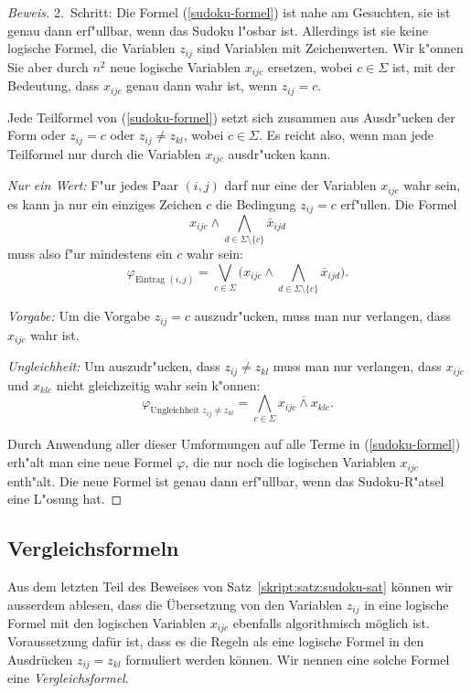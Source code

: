 \begin{proof}[Beweis]
2.~Schritt: Die Formel (\ref{sudoku-formel}) ist nahe am Gesuchten,
sie ist genau dann erf"ullbar, wenn das Sudoku l"osbar ist. Allerdings
ist sie keine logische Formel, die Variablen $z_{ij}$ sind Variablen mit
Zeichenwerten. Wir k"onnen Sie aber durch $n^2$ neue logische Variablen
$x_{ijc}$ ersetzen, wobei $c\in \Sigma$ ist, mit der Bedeutung, dass
$x_{ijc}$ genau dann wahr ist, wenn $z_{ij}=c$. 

Jede Teilformel von (\ref{sudoku-formel}) setzt sich zusammen
aus Ausdr"ucken der Form oder $z_{ij}=c$
oder $z_{ij}\ne z_{kl}$, wobei $c\in\Sigma$.
Es reicht also, wenn man jede Teilformel nur durch die Variablen $x_{ijc}$ 
ausdr"ucken kann.
\begin{compactenum}
\item {\em Nur ein Wert:} F"ur jedes Paar $(i,j)$ darf nur eine der
Variablen $x_{ijc}$ wahr sein, es kann ja nur ein einziges Zeichen $c$
die Bedingung $z_{ij}=c$ erf"ullen. Die Formel
\[
x_{ijc}\wedge \bigwedge_{d\in\Sigma\setminus\{c\}}\bar x_{ijd}
\]
muss also f"ur mindestens ein $c$ wahr sein:
\[
\varphi_{\text{Eintrag $(i,j)$}}
=
\bigvee_{c\in \Sigma}
\biggl(
x_{ijc}\wedge \bigwedge_{d\in\Sigma\setminus\{c\}}\bar x_{ijd}
\biggr).
\]
\item {\em Vorgabe:} Um die Vorgabe $z_{ij}=c$ auszudr"ucken, muss man
nur verlangen, dass $x_{ijc}$ wahr ist.
\item {\em Ungleichheit:} Um auszudr"ucken, dass $z_{ij} \ne z_{kl}$ muss
man nur verlangen, dass $x_{ijc}$ und $x_{klc}$ nicht gleichzeitig wahr
sein k"onnen:
\[
\varphi_{\text{Ungleichheit $z_{ij}\ne z_{kl}$}}
=
\bigwedge_{c\in\Sigma}
\overline{x_{ijc}\wedge x_{klc}}.
\]
\end{compactenum}
Durch Anwendung aller dieser Umformungen auf alle Terme in (\ref{sudoku-formel})
erh"alt man eine neue Formel $\varphi$, die nur noch die logischen
Variablen $x_{ijc}$ enth"alt. Die neue Formel ist genau dann erf"ullbar,
wenn das Sudoku-R"atsel eine L"osung hat.
\end{proof}

\subsection{Vergleichsformeln}
Aus dem letzten Teil des Beweises von Satz~\ref{skript:satz:sudoku-sat}
können wir ausserdem ablesen, dass die Übersetzung von den Variablen $z_{ij}$
in eine logische Formel mit den logischen Variablen $x_{ijc}$ ebenfalls
algorithmisch möglich ist.
Voraussetzung dafür ist, dass es die Regeln als eine logische Formel
in den Ausdrücken $z_{ij}=z_{kl}$ formuliert werden können.
Wir nennen eine solche Formel eine {\em Vergleichsformel}.

